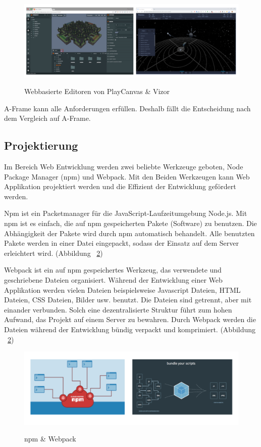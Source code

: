 \begin{figure}[ht]
\centering
\caption[Webbasierte Engine]{Webbasierte Editoren von PlayCanvas \& Vizor}
\includegraphics[width=\textwidth]{images/playCanvasVizor.png}
\label{fig:Webbasierte Engine}
\end{figure}

 A-Frame kann alle Anforderungen erfüllen. Deshalb fällt die Entscheidung nach dem Vergleich auf A-Frame.
 
 \subsection{Projektierung}
 Im Bereich Web Entwicklung werden zwei beliebte Werkzeuge geboten, Node Package Manager (npm) und Webpack. Mit den Beiden Werkzeugen kann Web Applikation projektiert werden und die Effizient der Entwicklung gefördert werden.
 
 Npm ist ein Packetmanager für die JavaScript-Laufzeitumgebung Node.js. Mit npm ist es einfach, die auf npm gespeicherten Pakete (Software) zu benutzen. Die Abhängigkeit der Pakete wird durch npm automatisch behandelt. Alle benutzten Pakete werden in einer Datei eingepackt, sodass der Einsatz auf dem Server erleichtert wird. (Abbildung ~\ref{fig:npmWebpack})
 
 Webpack ist ein auf npm gespeichertes Werkzeug, das verwendete und geschriebene Dateien organisiert. Während der Entwicklung einer Web Applikation werden vielen Dateien beispielsweise Javascript Dateien, HTML Dateien, CSS Dateien, Bilder usw. benutzt. Die Dateien sind getrennt, aber mit einander verbunden. Solch eine dezentralisierte Struktur führt zum hohen Aufwand, das Projekt auf einem Server zu bewahren. Durch Webpack werden die Dateien während der Entwicklung bündig verpackt und komprimiert. (Abbildung ~\ref{fig:npmWebpack})
 
\begin{figure}[ht]
\centering
\caption[Projektierungswerkzeuge]{npm \& Webpack}
\includegraphics[width=\textwidth]{images/npmWebpack.png}
\label{fig:npmWebpack}
\end{figure}
 

